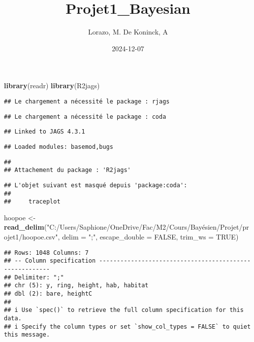 \documentclass[
]{article}
\title{Projet1\_Bayesian}
\author{Lorazo, M. De Koninck, A}
\date{2024-12-07}
\newenvironment{Shaded}{\begin{snugshade}}{\end{snugshade}}
\newcommand{\AttributeTok}[1]{\textcolor[rgb]{0.13,0.29,0.53}{#1}}
\newcommand{\ConstantTok}[1]{\textcolor[rgb]{0.56,0.35,0.01}{#1}}
\newcommand{\FunctionTok}[1]{\textcolor[rgb]{0.13,0.29,0.53}{\textbf{#1}}}
\newcommand{\NormalTok}[1]{#1}
\newcommand{\OtherTok}[1]{\textcolor[rgb]{0.56,0.35,0.01}{#1}}
\newcommand{\StringTok}[1]{\textcolor[rgb]{0.31,0.60,0.02}{#1}}
\begin{document}
\maketitle

\begin{Shaded}
\begin{Highlighting}[]
\FunctionTok{library}\NormalTok{(readr)}
\FunctionTok{library}\NormalTok{(R2jags)}
\end{Highlighting}
\end{Shaded}

\begin{verbatim}
## Le chargement a nécessité le package : rjags
\end{verbatim}

\begin{verbatim}
## Le chargement a nécessité le package : coda
\end{verbatim}

\begin{verbatim}
## Linked to JAGS 4.3.1
\end{verbatim}

\begin{verbatim}
## Loaded modules: basemod,bugs
\end{verbatim}

\begin{verbatim}
## 
## Attachement du package : 'R2jags'
\end{verbatim}

\begin{verbatim}
## L'objet suivant est masqué depuis 'package:coda':
## 
##     traceplot
\end{verbatim}

\begin{Shaded}
\begin{Highlighting}[]
\NormalTok{hoopoe }\OtherTok{\textless{}{-}} \FunctionTok{read\_delim}\NormalTok{(}\StringTok{"C:/Users/Saphione/OneDrive/Fac/M2/Cours/Bayésien/Projet/projet1/hoopoe.csv"}\NormalTok{, }\AttributeTok{delim =} \StringTok{";"}\NormalTok{, }\AttributeTok{escape\_double =} \ConstantTok{FALSE}\NormalTok{, }\AttributeTok{trim\_ws =} \ConstantTok{TRUE}\NormalTok{)}
\end{Highlighting}
\end{Shaded}

\begin{verbatim}
## Rows: 1048 Columns: 7
## -- Column specification --------------------------------------------------------
## Delimiter: ";"
## chr (5): y, ring, height, hab, habitat
## dbl (2): bare, heightC
## 
## i Use `spec()` to retrieve the full column specification for this data.
## i Specify the column types or set `show_col_types = FALSE` to quiet this message.
\end{verbatim}
\end{document}
